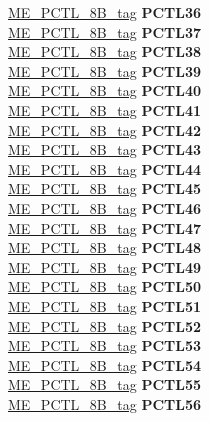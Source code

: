 \begin{DoxyCompactItemize}
\begin{tabbing}
\>\>\mbox{\hyperlink{unionME__PCTL__8B__tag}{ME\_PCTL\_8B\_tag}} {\bfseries PCTL36}\\
\>\>\mbox{\hyperlink{unionME__PCTL__8B__tag}{ME\_PCTL\_8B\_tag}} {\bfseries PCTL37}\\
\>\>\mbox{\hyperlink{unionME__PCTL__8B__tag}{ME\_PCTL\_8B\_tag}} {\bfseries PCTL38}\\
\>\>\mbox{\hyperlink{unionME__PCTL__8B__tag}{ME\_PCTL\_8B\_tag}} {\bfseries PCTL39}\\
\>\>\mbox{\hyperlink{unionME__PCTL__8B__tag}{ME\_PCTL\_8B\_tag}} {\bfseries PCTL40}\\
\>\>\mbox{\hyperlink{unionME__PCTL__8B__tag}{ME\_PCTL\_8B\_tag}} {\bfseries PCTL41}\\
\>\>\mbox{\hyperlink{unionME__PCTL__8B__tag}{ME\_PCTL\_8B\_tag}} {\bfseries PCTL42}\\
\>\>\mbox{\hyperlink{unionME__PCTL__8B__tag}{ME\_PCTL\_8B\_tag}} {\bfseries PCTL43}\\
\>\>\mbox{\hyperlink{unionME__PCTL__8B__tag}{ME\_PCTL\_8B\_tag}} {\bfseries PCTL44}\\
\>\>\mbox{\hyperlink{unionME__PCTL__8B__tag}{ME\_PCTL\_8B\_tag}} {\bfseries PCTL45}\\
\>\>\mbox{\hyperlink{unionME__PCTL__8B__tag}{ME\_PCTL\_8B\_tag}} {\bfseries PCTL46}\\
\>\>\mbox{\hyperlink{unionME__PCTL__8B__tag}{ME\_PCTL\_8B\_tag}} {\bfseries PCTL47}\\
\>\>\mbox{\hyperlink{unionME__PCTL__8B__tag}{ME\_PCTL\_8B\_tag}} {\bfseries PCTL48}\\
\>\>\mbox{\hyperlink{unionME__PCTL__8B__tag}{ME\_PCTL\_8B\_tag}} {\bfseries PCTL49}\\
\>\>\mbox{\hyperlink{unionME__PCTL__8B__tag}{ME\_PCTL\_8B\_tag}} {\bfseries PCTL50}\\
\>\>\mbox{\hyperlink{unionME__PCTL__8B__tag}{ME\_PCTL\_8B\_tag}} {\bfseries PCTL51}\\
\>\>\mbox{\hyperlink{unionME__PCTL__8B__tag}{ME\_PCTL\_8B\_tag}} {\bfseries PCTL52}\\
\>\>\mbox{\hyperlink{unionME__PCTL__8B__tag}{ME\_PCTL\_8B\_tag}} {\bfseries PCTL53}\\
\>\>\mbox{\hyperlink{unionME__PCTL__8B__tag}{ME\_PCTL\_8B\_tag}} {\bfseries PCTL54}\\
\>\>\mbox{\hyperlink{unionME__PCTL__8B__tag}{ME\_PCTL\_8B\_tag}} {\bfseries PCTL55}\\
\>\>\mbox{\hyperlink{unionME__PCTL__8B__tag}{ME\_PCTL\_8B\_tag}} {\bfseries PCTL56}\\

\end{tabbing}
\end{DoxyCompactItemize}
